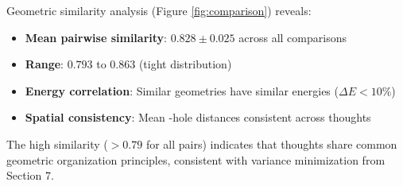 \begin{observation}
\label{obs:similarity}
Geometric similarity analysis (Figure \ref{fig:comparison}) reveals:
\begin{itemize}
\item \textbf{Mean pairwise similarity}: $0.828 \pm 0.025$ across all comparisons
\item \textbf{Range}: $0.793$ to $0.863$ (tight distribution)
\item \textbf{Energy correlation}: Similar geometries have similar energies ($\Delta E < 10\%$)
\item \textbf{Spatial consistency}: Mean -hole distances consistent across thoughts
\end{itemize}
\end{observation}

The high similarity ($> 0.79$ for all pairs) indicates that thoughts share common geometric organization principles, consistent with variance minimization from Section 7.

